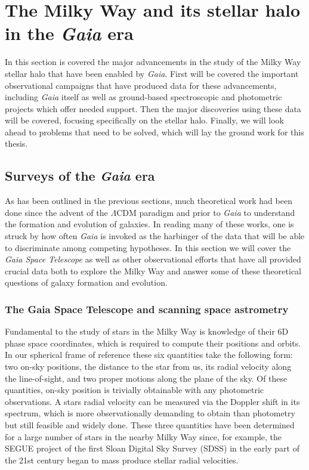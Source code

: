 
\section{The Milky Way and its stellar halo in the \textit{Gaia} era}

In this section is covered the major advancements in the study of the Milky Way stellar halo that have been enabled by \textit{Gaia}. First will be covered the important observational campaigns that have produced data for these advancements, including \textit{Gaia} itself as well as ground-based spectroscopic and photometric projects which offer needed support. Then the major discoveries using these data will be covered, focusing specifically on the stellar halo. Finally, we will look ahead to problems that need to be solved, which will lay the ground work for this thesis.

\subsection{Surveys of the \textit{Gaia} era}

As has been outlined in the previous sections, much theoretical work had been done since the advent of the $\Lambda$CDM paradigm and prior to \textit{Gaia} to understand the formation and evolution of galaxies. In reading many of these works, one is struck by how often \textit{Gaia} is invoked as the harbinger of the data that will be able to discriminate among competing hypotheses. In this section we will cover the \textit{Gaia Space Telescope} as well as other observational efforts that have all provided crucial data both to explore the Milky Way and answer some of these theoretical questions of galaxy formation and evolution.

\subsubsection{The Gaia Space Telescope and scanning space astrometry}

Fundamental to the study of stars in the Milky Way is knowledge of their 6D phase space coordinates, which is required to compute their positions and orbits. In our spherical frame of reference these six quantities take the following form: two on-sky positions, the distance to the star from us, its radial velocity along the line-of-sight, and two proper motions along the plane of the sky. Of these quantities, on-sky position is trivially obtainable with any photometric observations. A stars radial velocity can be measured via the Doppler shift in its spectrum, which is more observationally demanding to obtain than photometry but still feasible and widely done. These three quantities have been determined for a large number of stars in the nearby Milky Way since, for example, the SEGUE project of the first Sloan Digital Sky Survey (SDSS) in the early part of the 21st century began to mass produce stellar radial velocities.


